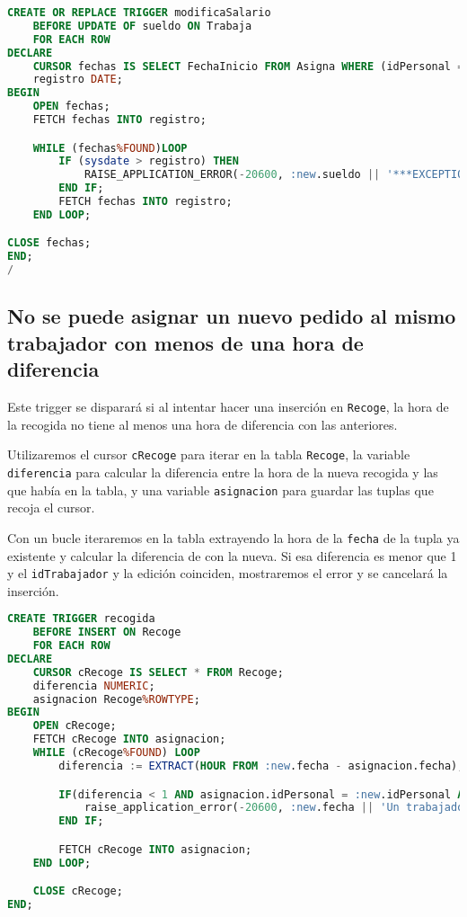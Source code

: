\begin{lstlisting}[language=sql]
CREATE OR REPLACE TRIGGER modificaSalario
	BEFORE UPDATE OF sueldo ON Trabaja
	FOR EACH ROW
DECLARE
	CURSOR fechas IS SELECT FechaInicio FROM Asigna WHERE (idPersonal = :new.idPersonal) ;
	registro DATE;
BEGIN
	OPEN fechas;
	FETCH fechas INTO registro;

	WHILE (fechas%FOUND)LOOP
		IF (sysdate > registro) THEN
			RAISE_APPLICATION_ERROR(-20600, :new.sueldo || '***EXCEPTION**** No se puede modificar el sueldo ya que ya ha empezado su trabajo');
		END IF;
		FETCH fechas INTO registro;
	END LOOP;

CLOSE fechas;
END;
/
\end{lstlisting}

\subsection{No se puede asignar un nuevo pedido al mismo trabajador con menos de una hora de diferencia}
Este trigger se disparará si al intentar hacer una inserción en \texttt{Recoge},
la hora de la recogida no tiene al menos una hora de diferencia con las
anteriores.

Utilizaremos el cursor \texttt{cRecoge} para iterar en la tabla \texttt{Recoge},
la variable \texttt{diferencia} para calcular la diferencia entre la hora de la
nueva recogida y las que había en la tabla, y una variable \texttt{asignacion}
para guardar las tuplas que recoja el cursor.

Con un bucle iteraremos en la tabla extrayendo la hora de la \texttt{fecha} de
la tupla ya existente y calcular la diferencia de con la nueva. Si esa diferencia
es menor que 1 y el \texttt{idTrabajador} y la edición coinciden, mostraremos
el error y se cancelará la inserción.

\begin{lstlisting}[language=sql]
CREATE TRIGGER recogida
	BEFORE INSERT ON Recoge
	FOR EACH ROW
DECLARE
	CURSOR cRecoge IS SELECT * FROM Recoge;
	diferencia NUMERIC;
	asignacion Recoge%ROWTYPE;
BEGIN
	OPEN cRecoge;
	FETCH cRecoge INTO asignacion;
	WHILE (cRecoge%FOUND) LOOP
		diferencia := EXTRACT(HOUR FROM :new.fecha - asignacion.fecha);

		IF(diferencia < 1 AND asignacion.idPersonal = :new.idPersonal AND asignacion.año = :new.año) THEN
			raise_application_error(-20600, :new.fecha || 'Un trabajador no puede serle asignado un pedido con menos de 1 hora de diferencia');
		END IF;

		FETCH cRecoge INTO asignacion;
	END LOOP;

	CLOSE cRecoge;
END;
\end{lstlisting}

